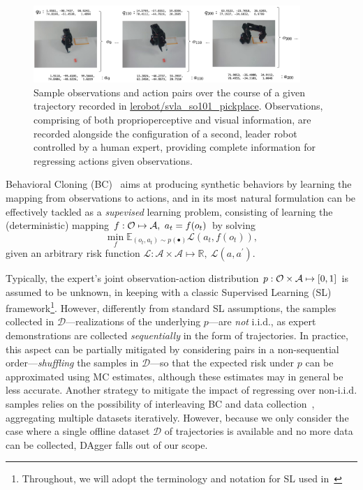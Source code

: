 \begin{figure}
    \centering
    \includegraphics[width=0.9\textwidth]{figures/ch4/ch4-observation-action-mapping.png}
    \caption{Sample observations and action pairs over the course of a given trajectory recorded in \url{lerobot/svla_so101_pickplace}. Observations, comprising of both proprioperceptive and visual information, are recorded alongside the configuration of a second, leader robot controlled by a human expert, providing complete information for regressing actions given observations.}
    \label{fig:ch4-observation-action-mapping}
\end{figure}

Behavioral Cloning (BC)~\citep{pomerleauALVINNAutonomousLand1988} aims at producing synthetic behaviors by learning the mapping from observations to actions, and in its most natural formulation can be effectively tackled as a \emph{supevised} learning problem, consisting of learning the (deterministic) mapping \(f: \mathcal O \mapsto \mathcal A, \ a_t = f(o_t) \) by solving
\begin{equation}\label{eq:loss-minimization-SL}
    \min_{f} \mathbb{E}_{(o_t, a_t) \sim p(\bullet)} \mathcal L(a_t, f(o_t)),
\end{equation}
given an arbitrary risk function \( \mathcal L:  \mathcal A \times \mathcal A \mapsto \mathbb{R}, \ \mathcal L (a, a^\prime) \).

Typically, the expert's joint observation-action distribution \( p: \mathcal O \times \mathcal A \mapsto [0,1] \) is assumed to be unknown, in keeping with a classic Supervised Learning (SL) framework\footnote{Throughout, we will adopt the terminology and notation for SL used in~\citet{shalev-shwartzUnderstandingMachineLearning2014}}.
However, differently from standard SL assumptions, the samples collected in \( \mathcal D \)---realizations of the underlying \( p \)---are \emph{not} i.i.d., as expert demonstrations are collected \emph{sequentially} in the form of trajectories.
In practice, this aspect can be partially mitigated by considering pairs in a non-sequential order---\emph{shuffling} the samples in \(\mathcal D \)---so that the expected risk under \( p \) can be approximated using MC estimates, although these estimates may in general be less accurate.
Another strategy to mitigate the impact of regressing over non-i.i.d. samples relies on the possibility of interleaving BC and data collection~\citep[DAgger]{rossReductionImitationLearning2011}, aggregating multiple datasets iteratively.
However, because we only consider the case where a single offline dataset \( \mathcal D \) of trajectories is available and no more data can be collected, DAgger falls out of our scope.

